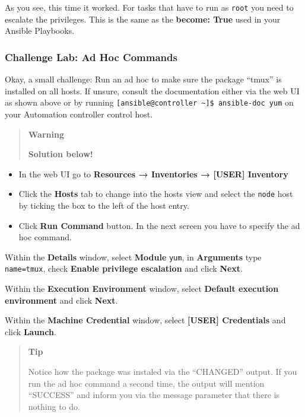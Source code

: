As you see, this time it worked. For tasks that have to run as
\texttt{root} you need to escalate the privileges. This is the same as
the \textbf{become: True} used in your Ansible Playbooks.

\hypertarget{challenge-lab-ad-hoc-commands}{%
\subsubsection{Challenge Lab: Ad Hoc
Commands}\label{challenge-lab-ad-hoc-commands}}

Okay, a small challenge: Run an ad hoc to make sure the package ``tmux''
is installed on all hosts. If unsure, consult the documentation either
via the web UI as shown above or by running
\texttt{{[}ansible@controller\ \textasciitilde{}{]}\$\ ansible-doc\ yum}
on your Automation controller control host.

\begin{quote}
\textbf{Warning}

\textbf{Solution below!}
\end{quote}

\begin{itemize}
\item
    In the web UI go to \textbf{Resources → Inventories → [USER]
  Inventory}
\item
  Click the \textbf{Hosts} tab to change into the hosts view and select
  the \texttt{node} host by ticking the box to the left of the host entry.
\item
  Click \textbf{Run Command} button. In the next screen you have to
  specify the ad hoc command.
\end{itemize}

Within the \textbf{Details} window, select \textbf{Module} \texttt{yum},
in \textbf{Arguments} type \texttt{name=tmux}, check \textbf{Enable
privilege escalation} and click \textbf{Next}.

Within the \textbf{Execution Environment} window, select \textbf{Default
execution environment} and click \textbf{Next}.

Within the \textbf{Machine Credential} window, select \textbf{[USER]
Credentials} and click \textbf{Launch}.

\begin{quote}
\textbf{Tip}

Notice how the package was instaled via the ``CHANGED'' output. If you
run the ad hoc command a second time, the output will mention
``SUCCESS'' and inform you via the message parameter that there is
nothing to do.
\end{quote}

